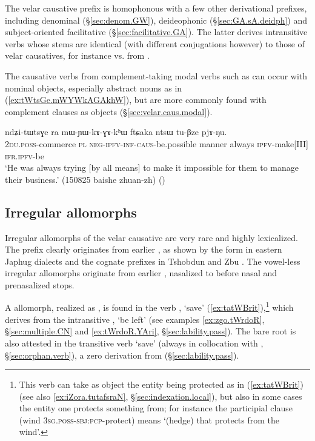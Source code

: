The velar causative  prefix is homophonous with a few other derivational prefixes, including denominal (§\ref{sec:denom.GW}), deideophonic (§\ref{sec:GA.sA.deidph}) and subject-oriented facilitative (§\ref{sec:facilitative.GA}). The latter derives intransitive verbs whose stems are identical (with different conjugations however) to those of velar causatives, for instance  vs.   from .
  

The causative verbs from com\-ple\-ment-taking modal verbs such as  can occur with nominal objects, especially abstract nouns as in (\ref{ex:tWtsGe.mWYWkAGAkhW}), but are more commonly found with complement clauses as objects (§\ref{sec:velar.caus.modal}).

\begin{exe}
\ex \label{ex:tWtsGe.mWYWkAGAkhW}
 \gll ndʑi-tɯtsɣe ra mɯ-ɲɯ-kɤ-ɣɤ-kʰɯ ftɕaka ntsɯ tu-βze pjɤ-ŋu. \\
 \textsc{2du}.\textsc{poss}-commerce \textsc{pl} \textsc{neg}-\textsc{ipfv}-\textsc{inf}-\textsc{caus}-be.possible manner always \textsc{ipfv}-make[III] \textsc{ifr}.\textsc{ipfv}-be \\
 \glt `He was always trying [by all means] to make it impossible for them to manage their business.' (150825 baishe zhuan-zh)
 ()
\end{exe} 

\subsection{Irregular allomorphs} \label{sec:causative.m}
Irregular allomorphs of the velar causative are very rare and highly lexicalized. The  prefix clearly originates from earlier , as shown by the form  in eastern Japhug dialects and the cognate prefixes  in Tshobdun and Zbu \citep{jackson14morpho}.  The vowel-less irregular allomorphs originate from earlier , nasalized to  before nasal and prenasalized stops. 

A  allomorph, realized as , is found in the verb , `save' (\ref{ex:tatWBrit}),\footnote{This verb can take as object the entity being protected as in (\ref{ex:tatWBrit}) (see also \ref{ex:iZora.tutafsraN}, §\ref{sec:indexation.local}), but also in some cases the entity one protects something from; for instance the participial clause  (wind \textsc{3sg}.\textsc{poss}-\textsc{sbj}:\textsc{pcp}-protect) means `(hedge) that protects from the wind'. } which derives from the intransitive , `be left' (see examples \ref{ex:zgo.tWrdoR}, §\ref{sec:multiple.CN} and \ref{ex:tWrdoR.YAri}, §\ref{sec:lability.pass}). The bare root  is also attested in the transitive verb  `save' (always in collocation with , §\ref{sec:orphan.verb}), a zero derivation from  (§\ref{sec:lability.pass}). 

